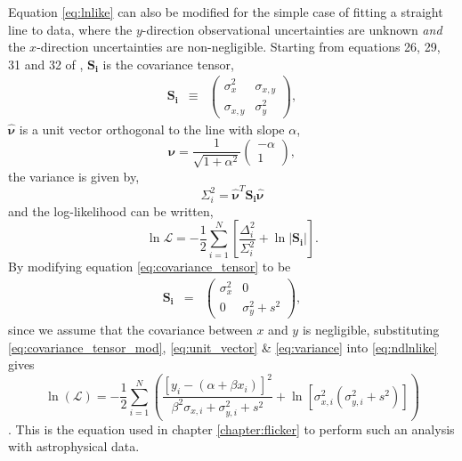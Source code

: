Equation \ref{eq:lnlike} can also be modified for the simple case of fitting a
straight line to data, where the $y$-direction observational uncertainties are
unknown {\it and} the $x$-direction uncertainties are non-negligible.
Starting from equations 26, 29, 31 and 32 of \citet{Hogg2010},
$\mathbf{S_i}$ is the covariance tensor,
\begin{eqnarray}
    \mathbf{S_i} &\equiv& \left( \begin{array}{cc}
                    \sigma_{x}^2 & \sigma_{x,y} \\
                    \sigma_{x,y} & \sigma_{y}^2
\end{array}\right),
\end{eqnarray}
\label{eq:covariance_tensor}
$\mathbf{\hat{\nu}}$ is a unit vector orthogonal to the line with slope
$\alpha$,
\begin{equation}
    \mathbf{\hat{\nu}} = \frac{1}{\sqrt{1 + \alpha^2}} \left( \begin{array}{c}
                                                    -\alpha \\
                                                    1
    \end{array}\right),
\end{equation}
\label{eq:unit_vector}
the variance is given by,
\begin{equation}
    \Sigma_i^2 = \mathbf{\hat{\nu}}^T \mathbf{S_i} \mathbf{\hat{\nu}}
\end{equation}
\label{eq:variance}
and the log-likelihood can be written,
\begin{equation}
    \ln\mathcal{L} = - \frac{1}{2} \sum_{i=1}^N \left[
    \frac{\Delta_i^2}{\Sigma_i^2} + \ln|\mathbf{S_i}| \right].
\end{equation}
\label{eq:ndlnlike}
By modifying equation \ref{eq:covariance_tensor} to be
\begin{eqnarray}
    \mathbf{S_i} &=& \left( \begin{array}{cc}
                    \sigma_{x}^2 & 0 \\
                    0 & \sigma_{y}^2 + s^2
\end{array}\right),
\end{eqnarray}
\label{eq:covariance_tensor_mod}
since we assume that the covariance between $x$ and $y$ is negligible,
substituting \ref{eq:covariance_tensor_mod}, \ref{eq:unit_vector} \&
\ref{eq:variance} into \ref{eq:ndlnlike} gives
\begin{equation}
    \ln(\mathcal{L}) = -\frac{1}{2} \sum_{i=1}^N
    \left( \frac{\left[ y_i - (\alpha + \beta x_i) \right]^2}
    {\beta^2\sigma_{x, i} + \sigma_{y, i}^2 + s^2} + \ln[\sigma_{x,
    i}^2(\sigma_{y, i}^2 + s^2)]
    \right)
\end{equation}.
This is the equation used in chapter \ref{chapter:flicker} to perform such an
analysis with astrophysical data.

